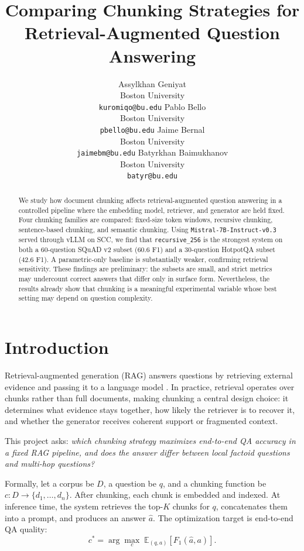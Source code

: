\documentclass[11pt]{article}
\title{Comparing Chunking Strategies for Retrieval-Augmented Question Answering}
\author{
  Assylkhan Geniyat \\
  Boston University \\
  \texttt{kuromiqo@bu.edu} \And
  Pablo Bello \\
  Boston University \\
  \texttt{pbello@bu.edu} \And
  Jaime Bernal \\
  Boston University \\
  \texttt{jaimebm@bu.edu} \AND
  Batyrkhan Baimukhanov \\
  Boston University \\
  \texttt{batyr@bu.edu}
}
\date{}
\begin{document}
\maketitle

\begin{abstract}
We study how document chunking affects retrieval-augmented question answering in a controlled pipeline where the embedding model, retriever, and generator are held fixed. Four chunking families are compared: fixed-size token windows, recursive chunking, sentence-based chunking, and semantic chunking. Using \texttt{Mistral-7B-Instruct-v0.3} served through vLLM on SCC, we find that \texttt{recursive\_256} is the strongest system on both a 60-question SQuAD v2 subset (60.6 F1) and a 30-question HotpotQA subset (42.6 F1). A parametric-only baseline is substantially weaker, confirming retrieval sensitivity. These findings are preliminary: the subsets are small, and strict metrics may undercount correct answers that differ only in surface form. Nevertheless, the results already show that chunking is a meaningful experimental variable whose best setting may depend on question complexity.
\end{abstract}

\section{Introduction}

Retrieval-augmented generation (RAG) answers questions by retrieving external evidence and passing it to a language model \citep{lewis2020rag}. In practice, retrieval operates over chunks rather than full documents, making chunking a central design choice: it determines what evidence stays together, how likely the retriever is to recover it, and whether the generator receives coherent support or fragmented context.

This project asks: \textit{which chunking strategy maximizes end-to-end QA accuracy in a fixed RAG pipeline, and does the answer differ between local factoid questions and multi-hop questions?}

Formally, let a corpus be $D$, a question be $q$, and a chunking function be $c : D \rightarrow \{d_1, \dots, d_n\}$. After chunking, each chunk is embedded and indexed. At inference time, the system retrieves the top-$K$ chunks for $q$, concatenates them into a prompt, and produces an answer $\hat{a}$. The optimization target is end-to-end QA quality:
\[
c^* = \arg\max_c \; \mathbb{E}_{(q,a)} \left[ F_1(\hat{a}, a) \right].
\]
\end{document}
